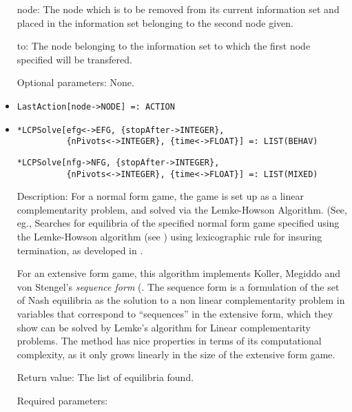 \begin{itemize}
\bd
\item
[node:] The node which is to be removed from its current information set
and placed in the information set belonging to the second node given.
\item
[to:] The node belonging to the information set to which the first
node specified will be transfered.
\ed

\item
[Optional parameters:] None.
\ed



\item
\protect \large \begin{verbatim} 
LastAction[node->NODE] =: ACTION
\end{verbatim}\normalsize

\item
\protect \large \begin{verbatim}
*LCPSolve[efg<->EFG, {stopAfter->INTEGER},
          {nPivots<->INTEGER}, {time<->FLOAT}] =: LIST(BEHAV)
\end{verbatim}\normalsize

\protect \large \begin{verbatim}
*LCPSolve[nfg->NFG, {stopAfter->INTEGER},
          {nPivots<->INTEGER}, {time<->FLOAT}] =: LIST(MIXED)
\end{verbatim}\normalsize
\bd
\item
[Description:] For a normal form game, the game is set up as a linear
complementarity problem, and solved via the Lemke-Howson Algorithm.
(See, eg., Searches for equilibria of the specified normal form game
specified using the Lemke-Howson algorithm (see
\cite[1964]{LemHow:64}) using lexicographic rule for insuring
termination, as developed in \cite[1971]{Eav:71}.

For an extensive form game, this algorithm implements Koller, Megiddo
and von Stengel's {\em sequence form} (\cite[1994]{KolMegSte:94}. The
sequence form is a formulation of the set of Nash equilibria as the
solution to a non linear complementarity problem in variables that
correspond to ``sequences'' in the extensive form, which they show can
be solved by Lemke's algorithm for Linear complementarity problems.
The method has nice properties in terms of its computational
complexity, as it only grows linearly in the size of the extensive
form game.  

\item
[Return value:] The list of equilibria found.
\item
[Required parameters:]\hfil\null


\end{itemize}
